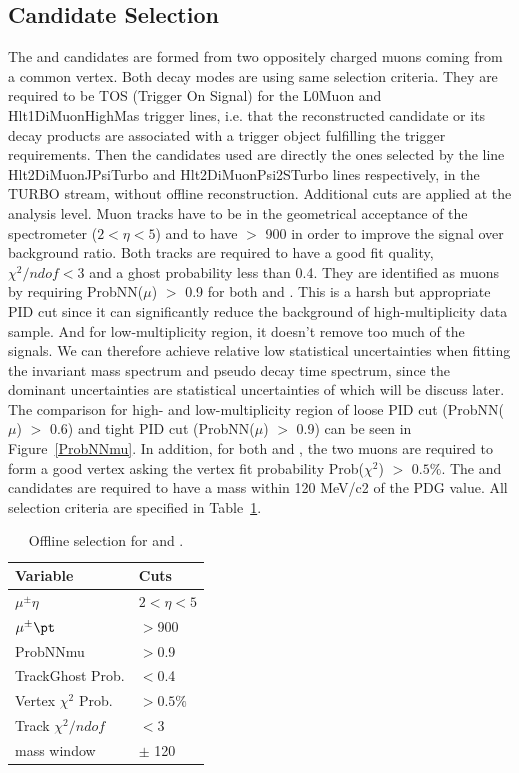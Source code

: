 \subsection{Candidate Selection}
The \jpsi and \psitwos candidates are formed from two oppositely charged muons coming from a common vertex. Both decay modes are using same selection criteria. They are required to be TOS (Trigger On Signal) for the L0Muon and Hlt1DiMuonHighMas trigger lines, i.e. that the reconstructed candidate or its decay products are associated with a trigger object fulfilling the trigger requirements. Then the candidates used are directly the ones selected by the line Hlt2DiMuonJPsiTurbo and Hlt2DiMuonPsi2STurbo lines respectively, in the TURBO stream, without offline reconstruction. 
Additional cuts are applied at the analysis level. Muon tracks have to be in the geometrical acceptance of the spectrometer ($2 < \eta < 5$) and to have \pt $>$ 900 \mevc in order to improve the signal over background ratio. Both tracks are required to have a good fit quality, $\chi^2/ndof < 3$ and a ghost probability less than 0.4. They are identified as muons by requiring ProbNN($\mu$) $>$ 0.9 for both \jpsi and \psitwos. This is a harsh but appropriate PID cut since it can significantly reduce the background of high-multiplicity \psitwos data sample. And for low-multiplicity region, it doesn't remove too much of the signals. We can therefore achieve relative low statistical uncertainties when fitting the invariant mass spectrum and pseudo decay time spectrum, since the dominant uncertainties are statistical uncertainties of \psitwos which will be discuss later. The comparison for high- and low-multiplicity region of loose PID cut (ProbNN($\mu$) $>$ 0.6) and tight PID cut (ProbNN($\mu$) $>$ 0.9) can be seen in Figure~\ref{ProbNNmu}.
In addition, for both \jpsi and \psitwos, the two muons are required to form a good vertex asking the vertex fit probability Prob($\chi^2$) $>$ $0.5\%$. The \psitwos and \jpsi candidates are required to have a mass within 120 MeV/c2 of the PDG value. All selection criteria are specified in Table~\ref{OfflineSelection}.
\begin{table}[H]
\caption{Offline selection for \jpsi and \psitwos.}
\begin{center}
\begin{tabular}{ll}
\hline
\textbf{Variable} & \textbf{Cuts}\\
\hline
	$\mu^{\pm} \eta$ & $2<\eta<5$\\
	$\mu^{\pm} \pt$ & $>$900 \mevc\\
	ProbNNmu & $>$0.9\\
	TrackGhost Prob. & $<$0.4\\
	Vertex $\chi^2$ Prob. & $>0.5\%$\\
	Track $\chi^2/ndof$ & $<$3\\
	mass window & $\pm$ 120 \mevcc\\
\hline
\end{tabular}
\end{center}
\label{OfflineSelection}
\end{table}
